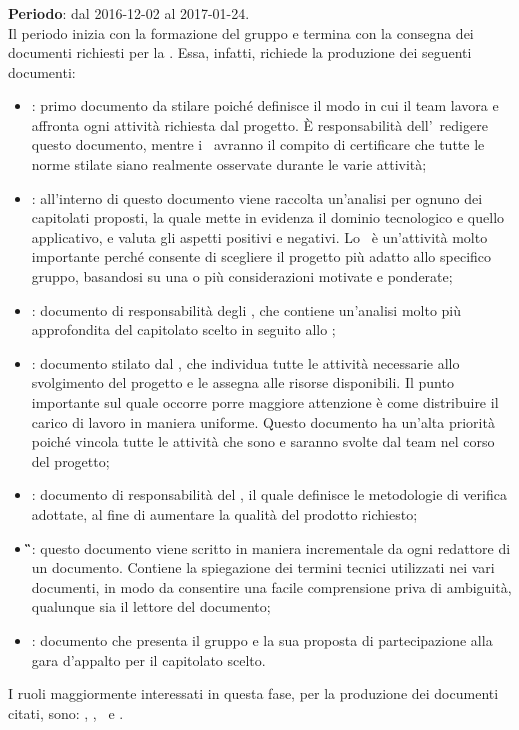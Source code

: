 		\subsubsection{\AR}
		\textbf{Periodo}: dal 2016-12-02 al 2017-01-24.\\
		Il periodo inizia con la formazione del gruppo e termina con la consegna dei documenti richiesti per la \RR. Essa, infatti, richiede la produzione dei seguenti documenti:
		\begin{itemize}
			\item \textbf{\NdP}: primo documento da stilare poiché definisce il modo in cui il team lavora e affronta ogni attività richiesta dal progetto. \MakeUppercase{è} responsabilità dell’\Amm\ redigere questo documento, mentre i \Vers\ avranno il compito di certificare che tutte le norme stilate siano realmente osservate durante le varie attività;
			\item \textbf{\SdF}: all'interno di questo documento viene raccolta un'analisi per ognuno dei capitolati proposti, la quale mette in evidenza il dominio tecnologico e quello applicativo, e valuta gli aspetti positivi e negativi. Lo \SdF\ è un’attività molto importante perché consente di scegliere il progetto più adatto allo specifico gruppo, basandosi su una o più considerazioni motivate e ponderate;
			\item \textbf{\AdR}: documento di responsabilità degli \Anas, che contiene un’analisi molto più approfondita del capitolato scelto in seguito allo \SdF;
			\item \textbf{\PdP}: documento stilato dal \RdP, che individua tutte le attività necessarie allo svolgimento del progetto e le assegna alle risorse disponibili. Il punto importante sul quale occorre porre maggiore attenzione è come distribuire il carico di lavoro in maniera uniforme. Questo documento ha un'alta priorità poiché vincola tutte le attività che sono e saranno svolte dal team nel corso del progetto;
			\item \textbf{\PdQ}: documento di responsabilità del \Ver, il quale definisce le metodologie di verifica adottate, al fine di aumentare la qualità del prodotto richiesto;
			\item \textbf{\G}: questo documento viene scritto in maniera incrementale da ogni redattore di un documento. Contiene la spiegazione dei termini tecnici utilizzati nei vari documenti, in modo da consentire una facile comprensione priva di ambiguità, qualunque sia il lettore del documento;
			\item \textbf{\LdP}: documento che presenta il gruppo e la sua proposta di partecipazione alla gara d’appalto per il capitolato scelto.
		\end{itemize}
		I ruoli maggiormente interessati in questa fase, per la produzione dei documenti citati, sono: \Amm, \Res, \Ana\ e \Ver.
		
